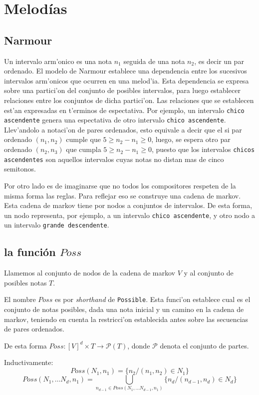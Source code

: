 
\section{Melod\'ias}
\subsection{Narmour}
Un intervalo arm'onico es una nota $n_1$ seguida de una nota $n_2$, es decir un par ordenado.
El modelo de Narmour establece una dependencia entre los sucesivos intervalos arm'onicos que ocurren en una melod'ia.
Esta dependencia se expresa sobre una partici'on del conjunto de posibles intervalos, para luego establecer relaciones entre los conjuntos de dicha partici'on.
Las relaciones que se establecen est'an expresadas en t'erminos de espectativa. Por ejemplo, un intervalo \texttt{chico ascendente} genera una espectativa de otro 
intervalo \texttt{chico ascendente}. Llev'andolo a notaci'on de pares ordenados, esto equivale a decir que el si par ordenado $(n_1, n_2)$ 
cumple que $5 \geq n_2 - n_1 \geq 0$, luego, se espera otro par ordenado $(n_2, n_3)$ que cumpla $5\geq n_2 - n_1 \geq 0$, 
puesto que los intervalos \texttt{chicos ascendentes} son aquellos intervalos cuyas notas no distan mas de cinco semitonos.

Por otro lado es de imaginarse que no todos los compositores respeten de la misma forma las reglas. Para reflejar eso se construye una cadena de markov.
Esta cadena de markov tiene por nodos a conjuntos de intervalos. De esta forma, un nodo representa, por ejemplo, a un intervalo \texttt{chico ascendente},
y otro nodo a un intervalo \texttt{grande descendente}. 

\subsection{la funci\'on $Poss$}
Llamemos al conjunto de nodos de la cadena de markov $V$ y al conjunto de posibles notas $T$.

El nombre $Poss$ es por \emph{shorthand} de \texttt{Possible}. Esta funci'on establece cual es el conjunto de notas posibles, dada una nota inicial y 
un camino en la cadena de markov, teniendo en cuenta la restricci'on establecida antes sobre las secuencias de pares ordenados.

De esta forma $Poss : [V]^d \times T \rightarrow \mathcal{P}(T)$, donde $\mathcal{P}$ denota el conjunto de partes.

Inductivamente:
$$Poss(N_1, n_1)= \{ n_2 / (n_1, n_2) \in N_1 \}$$
$$Poss(N_1, \dots N_d, n_1)= \bigcup_{n_{d-1} \in Poss(N_1, \dots N_{d-1}, n_1)} \{ n_d / (n_{d-1}, n_d) \in N_d \}$$


